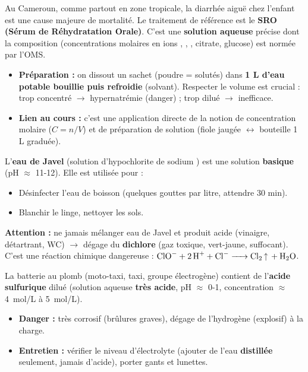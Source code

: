 \documentclass[11pt]{article}
\begin{document}
\begin{savaistu}
Au Cameroun, comme partout en zone tropicale, la diarrhée aiguë chez l'enfant est une cause majeure de mortalité. Le traitement de référence est le \textbf{SRO (Sérum de Réhydratation Orale)}. C'est une \textbf{solution aqueuse} précise dont la composition (concentrations molaires en ions , , , citrate, glucose) est normée par l'OMS.
\begin{itemize}
\item \textbf{Préparation :} on dissout un sachet (poudre = solutés) dans \textbf{1 L d'eau potable bouillie puis refroidie} (solvant). Respecter le volume est crucial : trop concentré $\rightarrow$ hypernatrémie (danger) ; trop dilué $\rightarrow$ inefficace.
\item \textbf{Lien au cours :} c'est une application directe de la notion de concentration molaire ($C = n/V$) et de préparation de solution (fiole jaugée $\leftrightarrow$ bouteille 1 L graduée).
\end{itemize}
\end{savaistu}

\begin{savaistu}
L'\textbf{eau de Javel} (solution d'hypochlorite de sodium ) est une solution \textbf{basique} (pH $\approx$ 11-12). Elle est utilisée pour :
\begin{itemize}
\item Désinfecter l'eau de boisson (quelques gouttes par litre, attendre 30 min).
\item Blanchir le linge, nettoyer les sols.
\end{itemize}
\textbf{Attention :} ne jamais mélanger eau de Javel et produit acide (vinaigre, détartrant, WC) $\rightarrow$ dégage du \textbf{dichlore } (gaz toxique, vert-jaune, suffocant). C'est une réaction chimique dangereuse : $\ce{ClO- + 2H+ + Cl- -> Cl2 ^ + H2O}$.
\end{savaistu}

\begin{savaistu}
La batterie au plomb (moto-taxi, taxi, groupe électrogène) contient de l'\textbf{acide sulfurique}  dilué (solution aqueuse \textbf{très acide}, pH $\approx$ 0-1, concentration $\approx$ \SI{4}{mol/L} à \SI{5}{mol/L}).
\begin{itemize}
\item \textbf{Danger :} très corrosif (brûlures graves), dégage de l'hydrogène  (explosif) à la charge.
\item \textbf{Entretien :} vérifier le niveau d'électrolyte (ajouter de l'eau \textbf{distillée} seulement, jamais d'acide), porter gants et lunettes.
\end{itemize}
\end{savaistu}
\end{document}
